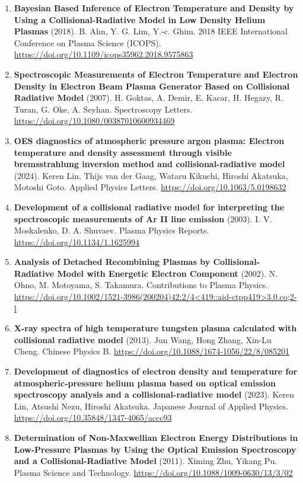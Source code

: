 \documentclass[11pt,a4paper]{article}
\begin{document}
\begin{enumerate}[leftmargin=1.4em]
\item \textbf{Bayesian Based Inference of Electron Temperature and Density by Using a Collisional-Radiative Model in Low Density Helium Plasmas} (2018). B. Ahn, Y. G. Lim, Y.-c. Ghim. 2018 IEEE International Conference on Plasma Science (ICOPS). \url{https://doi.org/10.1109/icops35962.2018.9575863}
\item \textbf{Spectroscopic Measurements of Electron Temperature and Electron Density in Electron Beam Plasma Generator Based on Collisional Radiative Model} (2007). H. Goktas, A. Demir, E. Kacar, H. Hegazy, R. Turan, G. Oke, A. Seyhan. Spectroscopy Letters. \url{https://doi.org/10.1080/00387010600934469}
\item \textbf{OES diagnostics of atmospheric pressure argon plasma: Electron temperature and density assessment through visible bremsstrahlung inversion method and collisional-radiative model} (2024). Keren Lin, Thijs van der Gaag, Wataru Kikuchi, Hiroshi Akatsuka, Motoshi Goto. Applied Physics Letters. \url{https://doi.org/10.1063/5.0198632}
\item \textbf{Development of a collisional radiative model for interpreting the spectroscopic measurements of Ar II line emission} (2003). I. V. Moskalenko, D. A. Shuvaev. Plasma Physics Reports. \url{https://doi.org/10.1134/1.1625994}
\item \textbf{Analysis of Detached Recombining Plasmas by Collisional-Radiative Model with Energetic Electron Component} (2002). N. Ohno, M. Motoyama, S. Takamura. Contributions to Plasma Physics. \url{https://doi.org/10.1002/1521-3986(200204)42:2/4<419::aid-ctpp419>3.0.co;2-l}
\item \textbf{X-ray spectra of high temperature tungsten plasma calculated with collisional radiative model} (2013). Jun Wang, Hong Zhang, Xin-Lu Cheng. Chinese Physics B. \url{https://doi.org/10.1088/1674-1056/22/8/085201}
\item \textbf{Development of diagnostics of electron density and temperature for atmospheric-pressure helium plasma based on optical emission spectroscopy analysis and a collisional-radiative model} (2023). Keren Lin, Atsushi Nezu, Hiroshi Akatsuka. Japanese Journal of Applied Physics. \url{https://doi.org/10.35848/1347-4065/accc93}
\item \textbf{Determination of Non-Maxwellian Electron Energy Distributions in Low-Pressure Plasmas by Using the Optical Emission Spectroscopy and a Collisional-Radiative Model} (2011). Ximing Zhu, Yikang Pu. Plasma Science and Technology. \url{https://doi.org/10.1088/1009-0630/13/3/02}

\end{enumerate}
\end{document}
